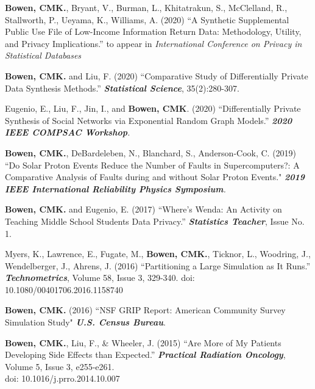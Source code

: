 \documentclass[11pt, letterpaper, roman]{moderncv} %
\begin{document}
\begin{etaremune}[topsep=0pt, itemsep=6pt, partopsep=0pt, parsep=0pt]
    \item \textbf{Bowen, CMK.}, Bryant, V., Burman, L., Khitatrakun, S., McClelland, R., Stallworth, P., Ueyama, K., Williams, A. (2020) ``A Synthetic Supplemental Public Use File of Low-Income Information Return Data: Methodology, Utility, and Privacy Implications.'' to appear in  \textit{International Conference on Privacy in Statistical Databases}

    \item \textbf{Bowen, CMK.} and Liu, F. (2020) ``Comparative Study of Differentially Private Data Synthesis Methods.'' \textbf{\textit{Statistical Science}}, 35(2):280-307.

    \item Eugenio, E., Liu, F., Jin, I., and \textbf{Bowen, CMK}. (2020) ``Differentially Private Synthesis of Social Networks via Exponential Random Graph Models.'' \textit{\textbf{2020 IEEE COMPSAC Workshop}.}

    \item \textbf{Bowen, CMK.}, DeBardeleben, N., Blanchard, S., Anderson-Cook, C. (2019) ``Do Solar Proton Events Reduce the Number of Faults in Supercomputers?: A Comparative Analysis of Faults during and without Solar Proton Events." \textit{\textbf{2019 IEEE International Reliability Physics Symposium}.}

    \item \textbf{Bowen, CMK.} and Eugenio, E. (2017) ``Where's Wenda:  An Activity on Teaching Middle School Students Data Privacy.'' \textit{\textbf{Statistics Teacher}}, Issue No. 1.
    
    \item Myers, K., Lawrence, E., Fugate, M., \textbf{Bowen, CMK.}, Ticknor, L., Woodring, J., Wendelberger, J., Ahrens, J. (2016) ``Partitioning a Large Simulation as It Runs.'' \textit{\textbf{Technometrics}}, Volume 58, Issue 3, 329-340. 
    doi: 10.1080/00401706.2016.1158740

    \item \textbf{Bowen, CMK.} (2016) ``NSF GRIP Report: American Community Survey Simulation Study" \textbf{\textit{U.S. Census Bureau}}.   

    \item \textbf{Bowen, CMK.}, Liu, F., \& Wheeler, J. (2015) ``Are More of My Patients Developing Side Effects than Expected.'' \textit{\textbf{Practical Radiation Oncology}}, Volume 5, Issue 3, e255-e261.\\
    doi: 10.1016/j.prro.2014.10.007
    

\end{etaremune}
\end{document}
